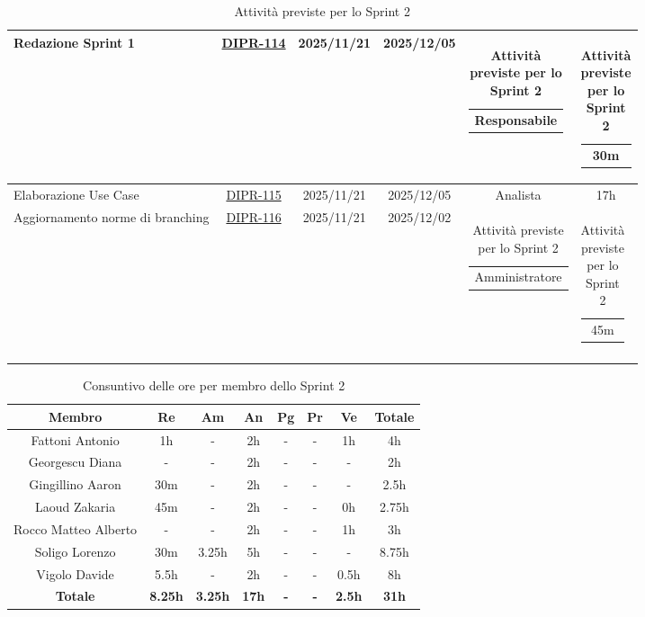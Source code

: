 \documentclass[a4paper,12pt]{article}
\begin{document}
\begin{spacing}{1}
\begin{longtable}{|p{4cm}|c|c|c|c|c|}
            \hline
            Redazione Sprint 1 & \href{https://7zpus.atlassian.net/browse/DIPR-114}{DIPR-114} & 2025/11/21 & 2025/12/05 & \begin{tabular}[c]{@{}c@{}} Responsabile \end{tabular} & \begin{tabular}[c]{@{}c@{}} 30m \end{tabular} \\
            \hline
            Elaborazione Use Case & \href{https://7zpus.atlassian.net/browse/DIPR-115}{DIPR-115} & 2025/11/21 & 2025/12/05 & Analista & 17h \\
            \hline
            Aggiornamento norme di branching & \href{https://7zpus.atlassian.net/browse/DIPR-116}{DIPR-116} & 2025/11/21 & 2025/12/02 & \begin{tabular}[c]{@{}c@{}} Amministratore \end{tabular} & \begin{tabular}[c]{@{}c@{}} 45m \end{tabular} \\ %
            \hline
            \caption{Attività previste per lo Sprint 2}
        \end{longtable}
    \end{spacing}


\begin{table}[H]
    \begin{adjustwidth}{-4cm}{-4cm}
    \centering
    \begin{tabular}{|c|c|c|c|c|c|c|c|}
        \hline
        \textbf{Membro}& \textbf{Re} & \textbf{Am} & \textbf{An} & \textbf{Pg} & \textbf{Pr} & \textbf{Ve} & \textbf{Totale} \\
        \hline
        Fattoni Antonio         & 1h    & -     & 2h & - & - & 1h   & 4h \\
        \hline
        Georgescu Diana         & -     & -     & 2h & - & - & -    & 2h \\
        \hline
        Gingillino Aaron        & 30m   & -     & 2h & - & - & -    & 2.5h \\
        \hline
        Laoud Zakaria           & 45m   & -     & 2h & - & - & 0h   & 2.75h \\
        \hline
        Rocco Matteo Alberto    & -     & -     & 2h & - & - & 1h   & 3h \\
        \hline
        Soligo Lorenzo          & 30m   & 3.25h & 5h & - & - & -    & 8.75h \\
        \hline
        Vigolo Davide           & 5.5h  & -     & 2h & - & - & 0.5h & 8h \\
        \hline
        \textbf{Totale} & \textbf{8.25h}& \textbf{3.25h} & \textbf{17h}& \textbf{-}& \textbf{-}& \textbf{2.5h}& \textbf{31h}\\
        \hline
    \end{tabular}
    \caption{Consuntivo delle ore per membro dello Sprint 2}
    \end{adjustwidth}
\end{table}
\end{document}
